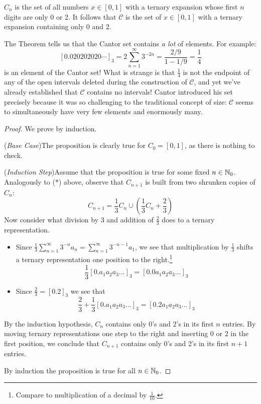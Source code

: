 \begin{thm}{}{}
	$C_n$ is the set of all numbers $x\in[0,1]$ with a ternary expansion whose first $n$ digits are only 0 or 2. It follows that $\mathcal C$ is the set of $x\in[0,1]$ with a ternary expansion containing only 0 and 2.
\end{thm}

The Theorem tells us that the Cantor set contains \emph{a lot} of elements. For example:
\[
	[0.020202020\cdots]_3=2\sum_{n=1}^\infty 3^{-2n}=\frac{2/9}{1-1/9}=\frac 14
\]
is an element of the Cantor set! What is strange is that $\frac 14$ is not the endpoint of any of the open intervals deleted during the construction of $\mathcal C$, and yet we've already established that $\mathcal C$ contains no intervals! Cantor introduced his set precisely because it was so challenging to the traditional concept of size: $\mathcal C$ seems to simultaneously have very few elements and enormously many.

\begin{proof}
	We prove by induction.\par
	(\emph{Base Case})\quad The proposition is clearly true for $C_0=[0,1]$, as there is nothing to check.\par
	(\emph{Induction Step})\quad Assume that the proposition is true for some fixed $n\in\mathbb{N}_0$. Analogously to ($\ast$) above, observe that $C_{n+1}$ is built from two shrunken copies of $C_n$:
	\[
		C_{n+1}=\frac 13C_n\cup\left(\frac 13C_n+\frac 23\right)
	\]
	Now consider what division by 3 and addition of $\frac 23$ does to a ternary representation.
	\begin{itemize}
	  \item Since $\frac 13\sum_{n=1}^\infty 3^{-n}a_n=\sum_{n=1}^\infty 3^{-n-1}a_1$, we see that multiplication by $\frac 13$ shifts a ternary representation one position to the right.\footnote{Compare to multiplication of a decimal by $\frac 1{10}$.}
		\[
			\frac 13[0.a_1a_2a_3\ldots]_3=[0.0a_1a_2a_3\ldots]_3
		\]
		\item Since $\frac 23=[0.2]_3$ we see that
		\[
			\frac 23+\frac 13[0.a_1a_2a_3\ldots]_3=[0.2a_1a_2a_3\ldots]_3
			\]
	\end{itemize}
	By the induction hypothesis, $C_n$ contains only 0's and 2's in its first $n$ entries. By moving ternary representations one step to the right and inserting 0 or 2 in the first position, we conclude that $C_{n+1}$ contains only 0's and 2's in its first $n+1$ entries.\par
	By induction the proposition is true for all $n\in\mathbb{N}_0$.
\end{proof}

